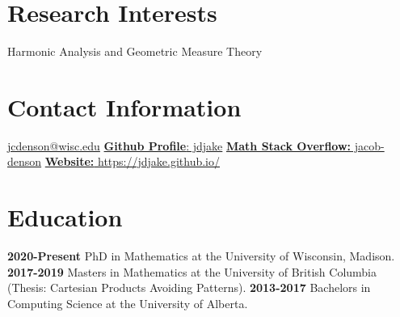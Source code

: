 \documentclass[a4paper]{cv-friggeri}
\begin{document}


\begin{aside} %
\section{Research Interests}
Harmonic Analysis and Geometric Measure Theory
~
\section{Contact Information}
\href{mailto:denson@math.ubc.ca}{jcdenson@wisc.edu}
\href{https://github.com/jdjake}{{\bf Github Profile}: jdjake}
\href{https://math.stackexchange.com/users/120724/jacob-denson}{{\bf Math Stack Overflow:} jacob-denson}
\href{https://jdjake.github.io/}{{\bf Website:} https://jdjake.github.io/}
~
\section{Education}
{\bf 2020-Present}
PhD in Mathematics at the University of Wisconsin, Madison.
{\bf 2017-2019}
Masters in Mathematics at the University of British Columbia (Thesis: Cartesian Products Avoiding Patterns).
{\bf 2013-2017}
Bachelors in Computing Science at the University of Alberta.
~

\end{aside}
\end{document}
